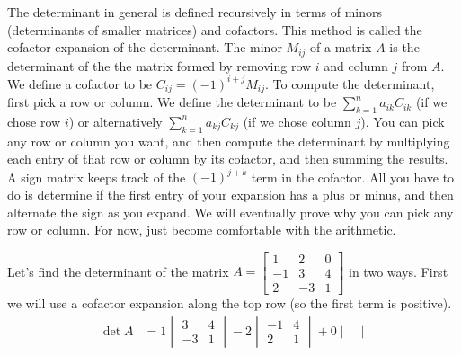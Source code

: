 {The determinant in general is defined recursively in terms of minors (determinants of smaller matrices) and cofactors. 
This method is called the cofactor expansion of the determinant. 
The minor {$M_{ij}$} of a matrix {$A$} is the determinant of the the matrix formed by removing row {$i$} and column {$j$} from {$A$}.  
We define a cofactor to be {$C_{ij} = (-1)^{i+j}M_{ij}$}.  
To compute the determinant, first pick a row or column.
We define the determinant to be $\sum_{k=1}^n a_{ik}C_{ik}$ (if we chose row $i$) or alternatively $\sum_{k=1}^n a_{kj}C_{kj}$ (if we chose column $j$). 
You can pick any row or column you want, and then compute the determinant by multiplying each entry of that row or column by its cofactor, and then summing the results.  
A sign matrix keeps track of the $(-1)^{j+k}$ term in the cofactor. All you have to do is determine if the first entry of your expansion has a plus or minus, and then alternate the sign as you expand. We will eventually prove why you can pick any row or column. For now, just become comfortable with the arithmetic.
\begin{example} \label{ex det}
Let's find the determinant of the matrix
$A = 
\begin{bmatrix}
1&2&0\\
-1&3&4\\
2&-3&1
\end{bmatrix}
$
in two ways. First we will use a cofactor expansion along the top row (so the first term is positive).
\begin{align*}
\det A 
&=1\begin{vmatrix}
3&4\\
-3&1
\end{vmatrix}
-2\begin{vmatrix}
-1&4\\
2&1
\end{vmatrix}
+0\begin{vmatrix}

\end{vmatrix}
\end{align*}
\end{example}}
